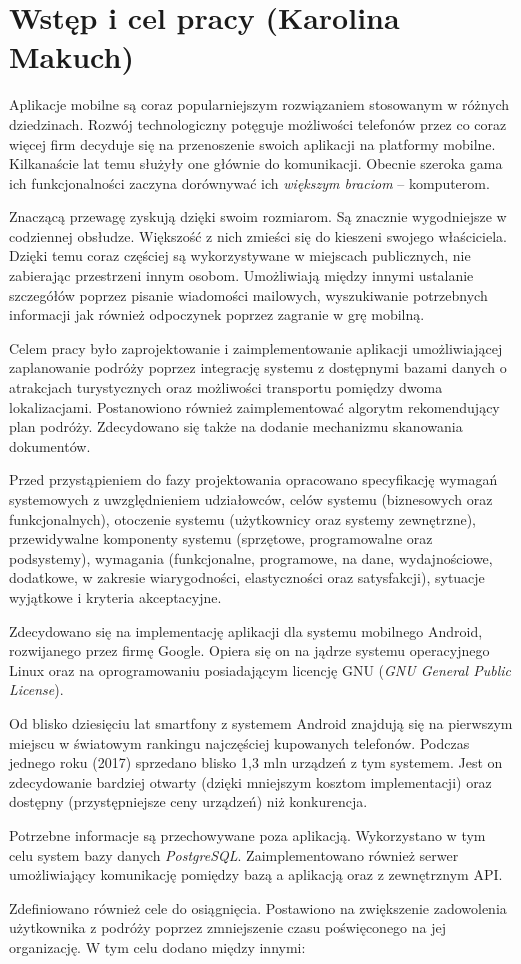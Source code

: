 \chapter{Wstęp i cel pracy (Karolina Makuch)}
\par Aplikacje mobilne są coraz popularniejszym rozwiązaniem stosowanym w różnych dziedzinach. Rozwój technologiczny potęguje możliwości telefonów przez co coraz więcej firm decyduje się na przenoszenie swoich aplikacji na platformy mobilne. Kilkanaście lat temu  służyły one głównie do komunikacji. Obecnie szeroka gama ich funkcjonalności zaczyna dorównywać ich \textit{większym braciom} -- komputerom.
\par Znaczącą przewagę zyskują dzięki swoim rozmiarom. Są znacznie wygodniejsze w codziennej obsłudze. Większość z nich zmieści się do kieszeni swojego właściciela. Dzięki temu coraz częściej są wykorzystywane w miejscach publicznych, nie zabierając przestrzeni innym osobom. Umożliwiają między innymi ustalanie szczegółów poprzez pisanie wiadomości mailowych, wyszukiwanie potrzebnych informacji jak również odpoczynek poprzez zagranie w grę mobilną.
\par Celem pracy było zaprojektowanie i zaimplementowanie aplikacji umożliwiającej zaplanowanie podróży poprzez integrację systemu z dostępnymi bazami danych o atrakcjach turystycznych oraz możliwości transportu pomiędzy dwoma lokalizacjami. Postanowiono również zaimplementować algorytm rekomendujący plan podróży. Zdecydowano się także na dodanie mechanizmu skanowania dokumentów. 
\par Przed przystąpieniem do fazy projektowania opracowano specyfikację wymagań systemowych z uwzględnieniem udziałowców, celów systemu (biznesowych oraz funkcjonalnych), otoczenie systemu (użytkownicy oraz systemy zewnętrzne), przewidywalne komponenty systemu (sprzętowe, programowalne oraz podsystemy), wymagania (funkcjonalne, programowe, na dane, wydajnościowe, dodatkowe, w zakresie wiarygodności, elastyczności oraz satysfakcji), sytuacje wyjątkowe i kryteria akceptacyjne.
\par Zdecydowano się na implementację aplikacji dla systemu mobilnego Android, rozwijanego przez firmę Google. Opiera się on na jądrze systemu operacyjnego Linux oraz na oprogramowaniu posiadającym licencję GNU (\textit{GNU General Public License}).
 \par Od blisko dziesięciu lat smartfony z systemem Android znajdują się na pierwszym miejscu w światowym rankingu najczęściej kupowanych telefonów. Podczas jednego roku (2017) sprzedano blisko 1,3 mln urządzeń z tym systemem. Jest on zdecydowanie bardziej otwarty (dzięki mniejszym kosztom implementacji) oraz dostępny (przystępniejsze ceny urządzeń) niż konkurencja.
\par Potrzebne informacje są przechowywane poza aplikacją. Wykorzystano w tym celu system bazy danych \textit{PostgreSQL}. Zaimplementowano również serwer umożliwiający komunikację pomiędzy bazą a aplikacją oraz z zewnętrznym API.
\par Zdefiniowano również cele do osiągnięcia. Postawiono na zwiększenie zadowolenia użytkownika z podróży poprzez zmniejszenie czasu poświęconego na jej organizację. W tym celu dodano między innymi:


